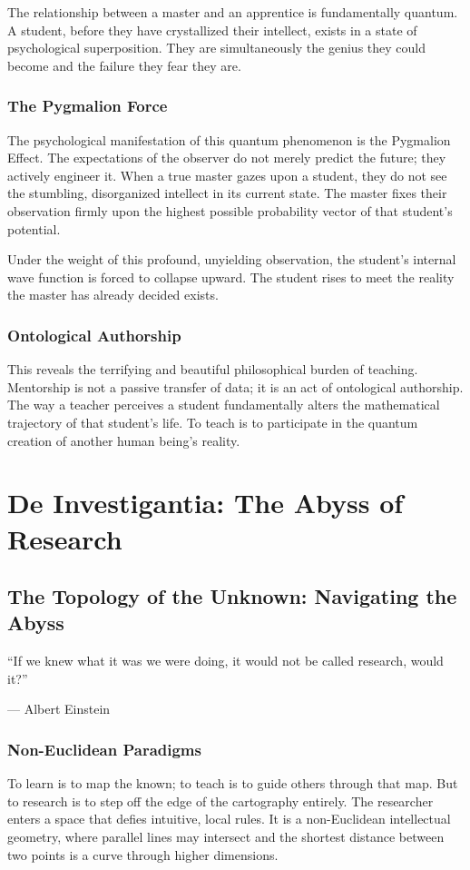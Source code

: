 \documentclass[11pt,a4paper,oneside]{book}
\theoremstyle{definition}
\theoremstyle{remark}
\begin{document}
The relationship between a master and an apprentice is fundamentally quantum. A student, before they have crystallized their intellect, exists in a state of psychological superposition. They are simultaneously the genius they could become and the failure they fear they are. 

\section{The Pygmalion Force}
The psychological manifestation of this quantum phenomenon is the Pygmalion Effect. The expectations of the observer do not merely predict the future; they actively engineer it. When a true master gazes upon a student, they do not see the stumbling, disorganized intellect in its current state. The master fixes their observation firmly upon the highest possible probability vector of that student's potential.

Under the weight of this profound, unyielding observation, the student's internal wave function is forced to collapse upward. The student rises to meet the reality the master has already decided exists.

\section{Ontological Authorship}
This reveals the terrifying and beautiful philosophical burden of teaching. Mentorship is not a passive transfer of data; it is an act of ontological authorship. The way a teacher perceives a student fundamentally alters the mathematical trajectory of that student's life. To teach is to participate in the quantum creation of another human being's reality.

\part{De Investigantia: The Abyss of Research}

\chapter{The Topology of the Unknown: Navigating the Abyss}
\epigraph{``If we knew what it was we were doing, it would not be called research, would it?''}{--- Albert Einstein}

\section{Non-Euclidean Paradigms}
To learn is to map the known; to teach is to guide others through that map. But to research is to step off the edge of the cartography entirely. The researcher enters a space that defies intuitive, local rules. It is a non-Euclidean intellectual geometry, where parallel lines may intersect and the shortest distance between two points is a curve through higher dimensions.
\end{document}

